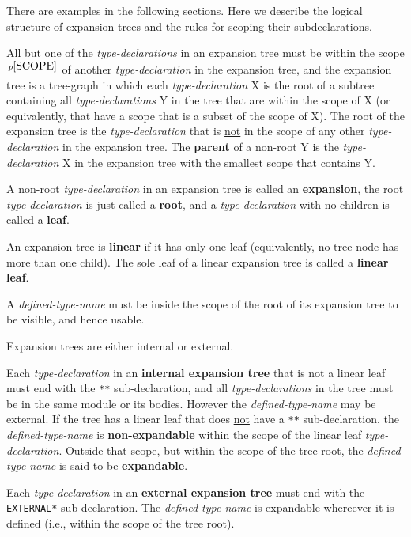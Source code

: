 \documentclass[12pt]{article}
\newcommand{\key}[1]{{\rm \bfseries #1}}
\newcommand{\pagnote}[1]{$\,^{p\pageref{#1}}$}
\begin{document}
There are examples in the following sections.  Here we describe the
logical structure of expansion trees and the rules for scoping
their subdeclarations.

All but one of the {\em type-declarations} in an expansion tree must be within
the scope\pagnote{SCOPE} of another {\em type-declaration}
in the expansion tree, and
the expansion tree is a tree-graph in which each {\em type-declaration} X is
the root of a subtree containing all {\em type-declarations} Y
in the tree
that are within the scope of X
(or equivalently, that have a scope
that is a subset of the scope of X).  The root of the expansion tree
is the {\em type-declaration} that is \underline{not} in the scope
of any other {\em type-declaration} in the expansion tree.
The \key{parent} of
a non-root Y is the {\em type-declaration} X in the expansion tree
with the smallest scope that contains Y.

A non-root {\em type-declaration} in an expansion tree is called an
\key{expansion}\label{EXPANSION},
the root {\em type-declaration} is just called
a \key{root}\label{ROOT},
and a {\em type-declaration} with no children
is called a \key{leaf}\label{LEAF}.

An expansion
tree is \key{linear} if it has only one leaf (equivalently, no tree node
has more than one child).
The sole leaf of a linear expansion tree is called a \key{linear leaf}.

A {\em defined-type-name} must be inside the scope of the root of its expansion
tree to be visible, and hence usable.

Expansion trees are either internal or external.

Each {\em type-declaration} in an \key{internal expansion tree}
that is not a linear leaf must end with
the {\tt ***}\label{***} sub-declaration, and all {\em type-declarations}
in the tree must be in the same module or its bodies.  However the
{\em defined-type-name} may be external.
If the tree has a linear leaf that does \underline{not}
have a {\tt ***} sub-declaration, the {\em defined-type-name}
is \key{non-expandable}
within the scope of the linear leaf {\em type-declaration}.
Outside that scope, but within the scope of the tree root,
the {\em defined-type-name} is said to be \key{expandable}.

Each {\em type-declaration} in an \key{external expansion tree}
must end with the {\tt *EXTERNAL*}\label{*EXTERNAL*} sub-declaration.
The {\em defined-type-name} is expandable whereever it is defined
(i.e., within the scope of the tree root).
\end{document}
